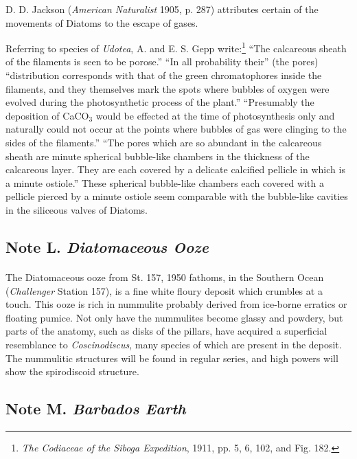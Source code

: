\documentclass[a4paper, 12pt, oneside]{article}
\begin{document}
D. D. Jackson (\emph{American Naturalist} 1905, p. 287) attributes certain of the movements of Diatoms to the escape of gases.

Referring to species of \emph{Udotea}, A. and E. S. Gepp write:\footnote{\emph{The Codiaceae of the \emph{Siboga} Expedition}, 1911, pp. 5, 6, 102, and Fig. 182.} ``The calcareous sheath of the filaments is seen to be porose.'' ``In all probability their'' (the pores) ``distribution corresponds with that of the green chromatophores inside the filaments, and they themselves mark the spots where bubbles of oxygen were evolved during the photosynthetic process of the plant.'' ``Presumably the deposition of CaCO$_{3}$ would be effected at the time of photosynthesis only and naturally could not occur at the points where bubbles of gas were clinging to the sides of the filaments.'' ``The pores which are so abundant in the calcareous sheath are minute spherical bubble-like chambers in the thickness of the calcareous layer. They are each covered by a delicate calcified pellicle in which is a minute ostiole.'' These spherical bubble-like chambers each covered with a pellicle pierced by a minute ostiole seem comparable with the bubble-like cavities in the siliceous valves of Diatoms.

\subsection{Note L. \emph{Diatomaceous Ooze}}
\paragraph{}
The Diatomaceous ooze from St. 157, 1950 fathoms, in the Southern Ocean (\emph{Challenger} Station 157), is a fine white floury deposit which crumbles at a touch. This ooze is rich in nummulite probably derived from ice-borne erratics or floating pumice. Not only have the nummulites become glassy and powdery, but parts of the anatomy, such as disks of the pillars, have acquired a superficial resemblance to \emph{Coscinodiscus}, many species of which are present in the deposit. The nummulitic structures will be found in regular series, and high powers will show the spirodiscoid structure.

\subsection{Note M. \emph{Barbados Earth}}
\end{document}

